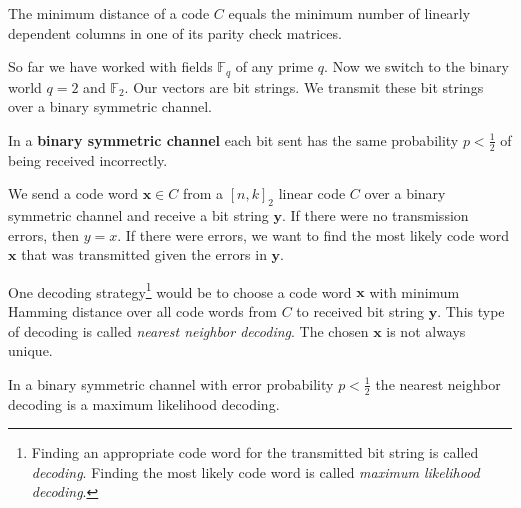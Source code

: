 \begin{lem}\label{minCodeParityCheckRel}
The minimum distance of a code $C$ equals the minimum number of linearly dependent columns in one of its parity check matrices. 
\end{lem}


So far we have worked with fields $\mathbb{F}_q$ of any prime $q$. Now we switch to the binary world $q=2$ and $\mathbb{F}_2$. Our vectors are bit strings. We transmit these bit strings over a binary symmetric channel. 

\begin{defn}\label{symChanDef}
In a \textbf{binary symmetric channel} each bit sent has the same probability $p < \frac{1}{2}$ of being received incorrectly.
\end{defn}

We send a code word $\bm{x} \in C$ from a $[n, k]_2$ linear code $C$ over a binary symmetric channel and receive a bit string $\bm{y}$. If there were no transmission errors, then $y=x$. If there were errors, we want to find the most likely code word $\bm{x}$ that was transmitted given the errors in $\bm{y}$.

One decoding strategy\footnote{Finding an appropriate code word for the transmitted bit string is called \textit{decoding}. Finding the most likely code word is called \textit{maximum likelihood decoding}.} would be to choose a code word $\bm{x}$ with minimum Hamming distance over all code words from $C$ to received bit string $\bm{y}$. This type of decoding is called \textit{nearest neighbor decoding}. The chosen $\bm{x}$ is not always unique.

\begin{thm}\label{nnDmaximumLike}
In a binary symmetric channel with error probability $p < \frac{1}{2}$ the nearest neighbor decoding is a maximum likelihood decoding.
\end{thm}

